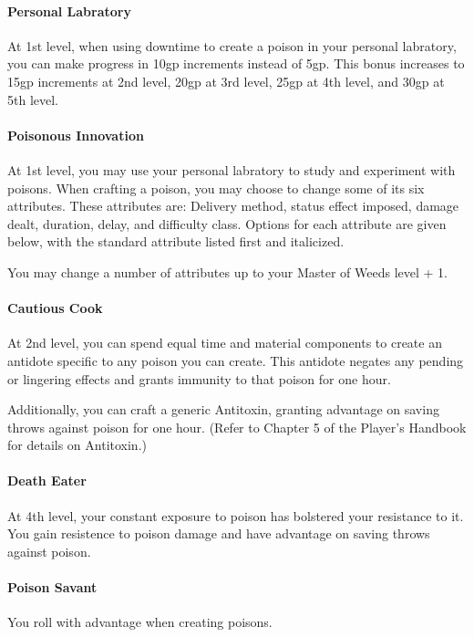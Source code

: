 \paragraph*{Personal Labratory}
At 1st level, when using downtime to create a poison in your personal labratory, you can make progress in 10gp increments instead of 5gp.
This bonus increases to 15gp increments at 2nd level, 20gp at 3rd level, 25gp at 4th level, and 30gp at 5th level.

\paragraph*{Poisonous Innovation}
  At 1st level, you may use your personal labratory to study and experiment with poisons.
  When crafting a poison, you may choose to change some of its six attributes.
  These attributes are: Delivery method, status effect imposed, damage dealt, duration, delay, and difficulty class.
  Options for each attribute are given below, with the standard attribute listed first and italicized.

  You may change a number of attributes up to your Master of Weeds level + 1.
  
  

\paragraph*{Cautious Cook}
At 2nd level, you can spend equal time and material components to create an antidote specific to any poison you can create.
This antidote negates any pending or lingering effects and grants immunity to that poison for one hour.

Additionally, you can craft a generic Antitoxin, granting advantage on saving throws against poison for one hour.  (Refer to Chapter 5 of the Player's Handbook for details on Antitoxin.)

\paragraph*{Death Eater}
At 4th level, your constant exposure to poison has bolstered your resistance to it.
You gain resistence to poison damage and have advantage on saving throws against poison.

\paragraph*{Poison Savant}
You roll with advantage when creating poisons.










